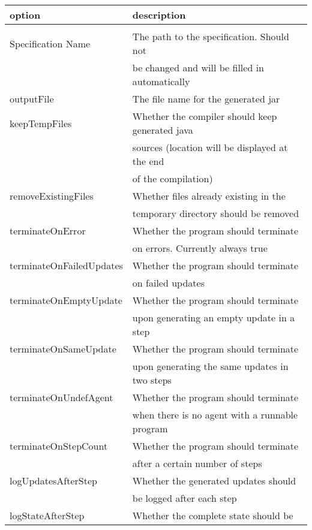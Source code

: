 \documentclass{article}
\begin{document}
\begin{table}%
\begin{tabular}{l l}
\textbf{option} & \textbf{description} \\
\hline
\vspace{-.75em}&\\
Specification Name 				& The path to the specification. Should not \\ 
													& be changed and will be filled in automatically \\
outputFile 								& The file name for the generated jar\\
keepTempFiles 						& Whether the compiler should keep generated java\\ 
													& sources (location will be displayed at the end\\ 
													& of the compilation)\\
removeExistingFiles 			& Whether files already existing in the\\ 
													& temporary directory should be removed \\
terminateOnError 					& Whether the program should terminate\\ 
													& on errors. Currently always true\\
terminateOnFailedUpdates 	& Whether the program should terminate\\ 
													& on failed updates\\
terminateOnEmptyUpdate 		& Whether the program should terminate\\ 
													& upon generating an empty update in a step\\
terminateOnSameUpdate 		& Whether the program should terminate\\ 
													& upon generating the same updates in two steps\\
terminateOnUndefAgent 		& Whether the program should terminate\\ 
													& when there is no agent with a runnable program\\
terminateOnStepCount 			& Whether the program should terminate\\ 
													& after a certain number of steps\\
logUpdatesAfterStep 			& Whether the generated updates should\\ 
													& be logged after each step\\
logStateAfterStep 				& Whether the complete state should be\\ 

\end{tabular}
\end{table}
\end{document}
